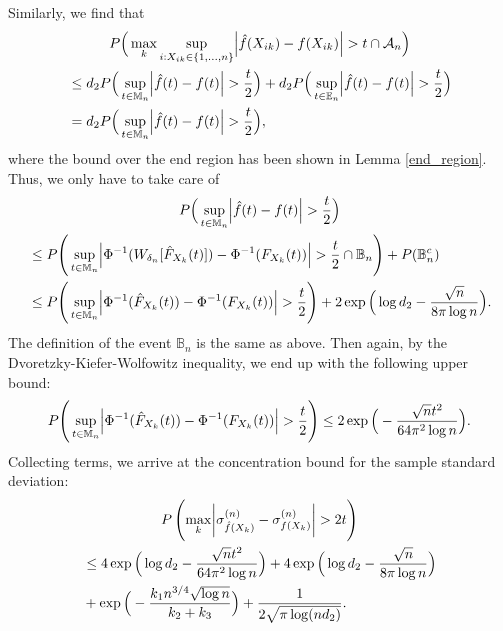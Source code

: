 Similarly, we find that
\begin{multline*}
    P\Big(\max_k \sup_{i: X_{ik} \in \{1,\dots,n\}} \abs{\hat{f}(X_{ik}) - f(X_{ik})} > t \cap \mathcal{A}_n \Big) \\
    \begin{aligned}
         & \leq d_2P\Big(\sup_{t \in \mathbb{M}_n} \abs{\hat{f}(t) - f(t)} > \frac{t}{2} \Big) + d_2 P\Big(\sup_{t \in \mathbb{E}_n} \abs{\hat{f}(t) - f(t)} > \frac{t}{2}\Big) \\
         & = d_2P\Big(\sup_{t \in \mathbb{M}_n} \abs{\hat{f}(t) - f(t)} > \frac{t}{2} \Big),
    \end{aligned}
\end{multline*}
where the bound over the end region has been shown in Lemma \ref{end_region}. Thus, we only have to take care of
\begin{multline*}
    P\Big(\sup_{t \in \mathbb{M}_n} \abs{\hat{f}(t) - f(t)} > \frac{t}{2}\Big) \\
    \begin{aligned}
         & \leq P\Bigg(\sup_{t \in \mathbb{M}_n} \abs{\Phi^{-1}(W_{\delta_n}[\hat{F}_{X_k}(t)]) - \Phi^{-1}(F_{X_k}(t))} > \frac{t}{2} \cap \mathbb{B}_n\Bigg) + P(\mathbb{B}_n^c)      \\
         & \leq P\Bigg(\sup_{t \in \mathbb{M}_n} \abs{\Phi^{-1}(\hat{F}_{X_k}(t)) - \Phi^{-1}(F_{X_k}(t))} > \frac{t}{2}\Bigg) + 2\exp\Big(\log d_2 - \frac{\sqrt{n}}{8\pi\log n}\Big).
    \end{aligned}
\end{multline*}
The definition of the event $\mathbb{B}_n$ is the same as above. Then again, by the Dvoretzky-Kiefer-Wolfowitz inequality, we end up with the following upper bound:
\begin{equation*}
    P\Bigg(\sup_{t \in \mathbb{M}_n} \abs{\Phi^{-1}(\hat{F}_{X_k}(t)) - \Phi^{-1}(F_{X_k}(t))} > \frac{t}{2}\Bigg) \leq 2\exp\Big(-\frac{\sqrt{n}t^2}{64 \pi^2\log n}\Big).
\end{equation*}
Collecting terms, we arrive at the concentration bound for the sample standard deviation:
\begin{multline*}
    P\left(\max_k \abs{\sigma^{(n)}_{\hat{f}(X_k)} - \sigma^{(n)}_{f(X_k)}} > 2t \right) \\
    \begin{aligned}
         & \leq 4\exp\Big(\log d_2 -\frac{\sqrt{n}t^2}{64 \pi^2\log n}\Big) +  4\exp\Big(\log d_2 - \frac{\sqrt{n}}{8\pi\log n}\Big) \\
         & +  \exp\Big(- \frac{k_1 n^{3/4} \sqrt{\log n}}{k_2+ k_3} \Big) + \frac{1}{2\sqrt{\pi \log(nd_2)}}.
    \end{aligned}
\end{multline*}

